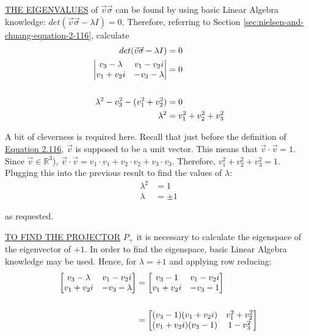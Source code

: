 \MakeUppercase{\underline{The eigenvalues}} of
$\vec{v} \vec{\sigma}$ can be found by using
basic Linear Algebra knowledge:
$det(\vec{v} \vec{\sigma} - \lambda I) = 0$.
Therefore, referring to Section \ref{sec:nielsen-and-chuang-equation-2-116},
calculate
%
\begin{align}
    det(\vec{v} \vec{\sigma} - \lambda I) &= 0 \\
    \left| \begin{matrix}
        v_3 - \lambda & v_1 - v_2i \\ v_1 + v_2i & -v_3 - \lambda
        \end{matrix} \right| &= 0 \\
    \notag \\
    \lambda^2 - v_3^2 - (v_1^2 + v_2^2) &= 0 \\
    \lambda^2 &= v_1^2 + v_2^2 + v_3^2
\end{align}

A bit of cleverness is required here.
Recall that just before the definition of
\hyperref[sec:nielsen-and-chuang-equation-2-116]{Equation 2.116},
$\vec{v}$ is supposed to be a unit vector.
This means that $\vec{v} \cdot \vec{v} = 1$.
Since $\vec{v} \in \mathbb{R}^3$),
$\vec{v} \cdot \vec{v} = v_1 \cdot v_1 +
v_2 \cdot v_2 + v_3 \cdot v_3$.
Therefore, $v_1^2 + v_2^2 + v_3^2 = 1$.
Plugging this into the previous result to find the values of $\lambda$:
%
\begin{align}
    \lambda^2 &= 1 \\
    \lambda &= \pm 1
\end{align}

as requested.

\MakeUppercase{\underline{To find the Projector}} $P_+$ it is necessary to
calculate the eigenspace of the eigenvector of $+1$.
In order to find the eigenspace, basic Linear Algebra knowledge may be used.
Hence, for $\lambda = +1$ and applying row reducing:
%
\begin{align}
    \left[ \begin{matrix}
        v_3 - \lambda & v_1 - v_2i \\ v_1 + v_2i & -v_3 - \lambda
        \end{matrix} \right]
        &=
        \left[ \begin{matrix}
            v_3 - 1 & v_1 - v_2i \\ v_1 + v_2i & -v_3 - 1
        \end{matrix} \right] \\ \notag \\
    &= \left[ \begin{matrix}
            (v_3 - 1)(v_1 + v_2i) & v_1^2 + v_2^2 \\
            (v_1 + v_2i)(v_3 - 1) & 1 -v_3^2
        \end{matrix} \right]
\end{align}

